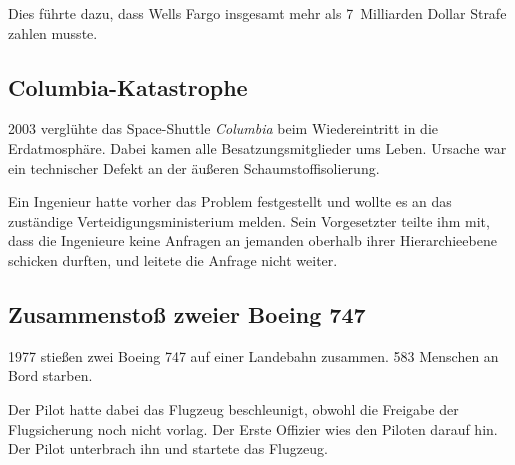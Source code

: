 Dies führte dazu, dass Wells Fargo insgesamt mehr als 7~Milliarden Dollar Strafe zahlen musste.

\subsection{Columbia-Katastrophe}

2003 verglühte das Space-Shuttle \emph{Columbia} beim Wiedereintritt in die Erdatmosphäre. Dabei kamen alle Besatzungsmitglieder ums Leben. Ursache war ein technischer Defekt an der äußeren Schaumstoffisolierung.

Ein Ingenieur hatte vorher das Problem festgestellt und wollte es an das zuständige Verteidigungsministerium melden. Sein Vorgesetzter teilte ihm mit, dass \glqq die Ingenieure keine Anfragen an jemanden oberhalb ihrer Hierarchieebene schicken durften\grqq, und leitete die Anfrage nicht weiter.

\subsection{Zusammenstoß zweier Boeing 747}

1977 stießen zwei Boeing 747 auf einer Landebahn zusammen. 583 Menschen an Bord starben.

Der Pilot hatte dabei das Flugzeug beschleunigt, obwohl die Freigabe der Flugsicherung noch nicht vorlag. Der Erste Offizier wies den Piloten darauf hin. Der Pilot unterbrach ihn und startete das Flugzeug.
